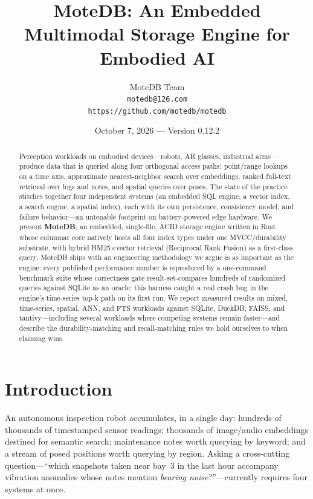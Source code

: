\documentclass[10pt]{article}
\title{\textbf{MoteDB: An Embedded Multimodal Storage Engine for Embodied AI}}
\author{MoteDB Team \\ \texttt{motedb@126.com} \\ \texttt{https://github.com/motedb/motedb}}
\date{October 7, 2026 --- Version 0.12.2}
\begin{document}
\maketitle

\begin{abstract}
Perception workloads on embodied devices---robots, AR glasses, industrial
arms---produce data that is queried along four orthogonal access paths:
point/range lookups on a time axis, approximate nearest-neighbor search over
embeddings, ranked full-text retrieval over logs and notes, and spatial
queries over poses. The state of the practice stitches together four
independent systems (an embedded SQL engine, a vector index, a search
engine, a spatial index), each with its own persistence, consistency model,
and failure behavior---an untenable footprint on battery-powered edge
hardware. We present \textbf{MoteDB}, an embedded, single-file, ACID storage
engine written in Rust whose columnar core natively hosts all four index
types under one MVCC/durability substrate, with hybrid BM25$\times$vector
retrieval (Reciprocal Rank Fusion) as a first-class query. MoteDB ships with
an engineering methodology we argue is as important as the engine: every
published performance number is reproduced by a one-command benchmark suite
whose correctness gate result-set-compares hundreds of randomized queries
against SQLite as an oracle; this harness caught a real crash bug in the
engine's time-series top-k path on its first run. We report measured results
on mixed, time-series, spatial, ANN, and FTS workloads against SQLite,
DuckDB, FAISS, and tantivy---including several workloads where competing
systems remain faster---and describe the durability-matching and
recall-matching rules we hold ourselves to when claiming wins.
\end{abstract}

\section{Introduction}

An autonomous inspection robot accumulates, in a single day: hundreds of
thousands of timestamped sensor readings; thousands of image/audio
embeddings destined for semantic search; maintenance notes worth querying by
keyword; and a stream of posed positions worth querying by region. Asking a
cross-cutting question---``which snapshots taken near bay~3 in the last
hour accompany vibration anomalies whose notes mention \emph{bearing
noise}?''---currently requires four systems at once.
\end{document}
